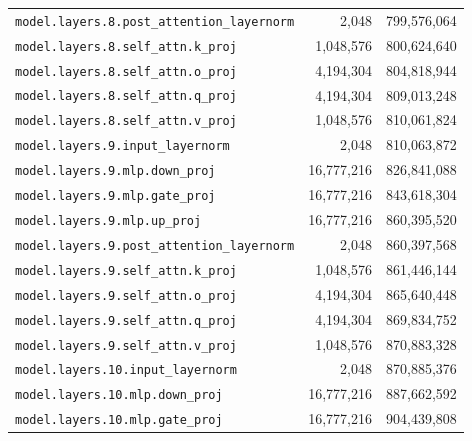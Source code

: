 \documentclass[10pt,a4paper]{article}
\theoremstyle{definition}
\begin{document}
\begin{appendices}
\begin{longtable}{p{9.5cm}rr}
\texttt{model.\allowbreak{}layers.\allowbreak{}8.\allowbreak{}post\_attention\_layernorm} & 2,048 & 799,576,064 \\
\texttt{model.\allowbreak{}layers.\allowbreak{}8.\allowbreak{}self\_attn.\allowbreak{}k\_proj} & 1,048,576 & 800,624,640 \\
\texttt{model.\allowbreak{}layers.\allowbreak{}8.\allowbreak{}self\_attn.\allowbreak{}o\_proj} & 4,194,304 & 804,818,944 \\
\texttt{model.\allowbreak{}layers.\allowbreak{}8.\allowbreak{}self\_attn.\allowbreak{}q\_proj} & 4,194,304 & 809,013,248 \\
\texttt{model.\allowbreak{}layers.\allowbreak{}8.\allowbreak{}self\_attn.\allowbreak{}v\_proj} & 1,048,576 & 810,061,824 \\
\texttt{model.\allowbreak{}layers.\allowbreak{}9.\allowbreak{}input\_layernorm} & 2,048 & 810,063,872 \\
\texttt{model.\allowbreak{}layers.\allowbreak{}9.\allowbreak{}mlp.\allowbreak{}down\_proj} & 16,777,216 & 826,841,088 \\
\texttt{model.\allowbreak{}layers.\allowbreak{}9.\allowbreak{}mlp.\allowbreak{}gate\_proj} & 16,777,216 & 843,618,304 \\
\texttt{model.\allowbreak{}layers.\allowbreak{}9.\allowbreak{}mlp.\allowbreak{}up\_proj} & 16,777,216 & 860,395,520 \\
\texttt{model.\allowbreak{}layers.\allowbreak{}9.\allowbreak{}post\_attention\_layernorm} & 2,048 & 860,397,568 \\
\texttt{model.\allowbreak{}layers.\allowbreak{}9.\allowbreak{}self\_attn.\allowbreak{}k\_proj} & 1,048,576 & 861,446,144 \\
\texttt{model.\allowbreak{}layers.\allowbreak{}9.\allowbreak{}self\_attn.\allowbreak{}o\_proj} & 4,194,304 & 865,640,448 \\
\texttt{model.\allowbreak{}layers.\allowbreak{}9.\allowbreak{}self\_attn.\allowbreak{}q\_proj} & 4,194,304 & 869,834,752 \\
\texttt{model.\allowbreak{}layers.\allowbreak{}9.\allowbreak{}self\_attn.\allowbreak{}v\_proj} & 1,048,576 & 870,883,328 \\
\texttt{model.\allowbreak{}layers.\allowbreak{}10.\allowbreak{}input\_layernorm} & 2,048 & 870,885,376 \\
\texttt{model.\allowbreak{}layers.\allowbreak{}10.\allowbreak{}mlp.\allowbreak{}down\_proj} & 16,777,216 & 887,662,592 \\
\texttt{model.\allowbreak{}layers.\allowbreak{}10.\allowbreak{}mlp.\allowbreak{}gate\_proj} & 16,777,216 & 904,439,808 \\

\end{longtable}
\end{appendices}
\end{document}
